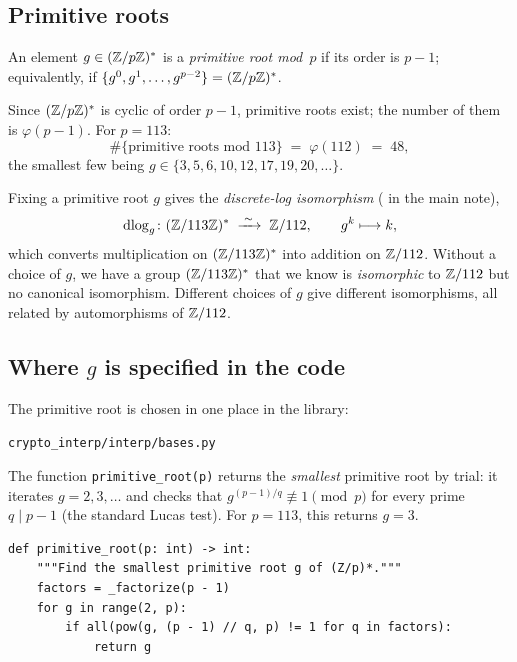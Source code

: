 \subsection{Primitive roots}
\label{subsec:prim-root}

\begin{definition}
\label{def:prim-root}
An element $g \in (\mathbb{Z}/p\mathbb{Z})^*$ is a \emph{primitive root mod~$p$} if its
order is $p-1$; equivalently, if $\{g^0, g^1, \ldots, g^{p-2}\} = (\mathbb{Z}/p\mathbb{Z})^*$.
\end{definition}

Since $(\mathbb{Z}/p\mathbb{Z})^*$ is cyclic of order $p-1$, primitive roots exist; the
number of them is $\varphi(p-1)$.  For $p = 113$:
\begin{equation}
  \#\{\text{primitive roots mod } 113\} \;=\; \varphi(112) \;=\; 48,
  \label{eq:num-prim-roots}
\end{equation}
the smallest few being $g \in \{3, 5, 6, 10, 12, 17, 19, 20, \ldots\}$.

Fixing a primitive root $g$ gives the \emph{discrete-log isomorphism}
( in the main note),
\begin{equation}
  \operatorname{dlog}_g \colon (\mathbb{Z}/113\mathbb{Z})^* \;\xrightarrow{\;\sim\;}\; \mathbb{Z}/112,
  \qquad g^{k} \longmapsto k,
  \label{eq:dlog-recap}
\end{equation}
which converts multiplication on $(\mathbb{Z}/113\mathbb{Z})^*$ into addition on $\mathbb{Z}/112$.
Without a choice of $g$, we have a group $(\mathbb{Z}/113\mathbb{Z})^*$ that we know is
\emph{isomorphic} to $\mathbb{Z}/112$ but no canonical isomorphism.  Different
choices of $g$ give different isomorphisms, all related by automorphisms of
$\mathbb{Z}/112$.

\subsection{Where \texorpdfstring{$g$}{g} is specified in the code}
\label{subsec:where-g}

The primitive root is chosen in one place in the library:
\begin{center}
\texttt{crypto\_interp/interp/bases.py}
\end{center}
The function \texttt{primitive\_root(p)} returns the \emph{smallest} primitive
root by trial: it iterates $g = 2, 3, \ldots$ and checks that
$g^{(p-1)/q} \not\equiv 1 \pmod p$ for every prime $q \mid p-1$ (the standard
Lucas test).  For $p = 113$, this returns $g = 3$.

\begin{verbatim}
def primitive_root(p: int) -> int:
    """Find the smallest primitive root g of (Z/p)*."""
    factors = _factorize(p - 1)
    for g in range(2, p):
        if all(pow(g, (p - 1) // q, p) != 1 for q in factors):
            return g
\end{verbatim}

